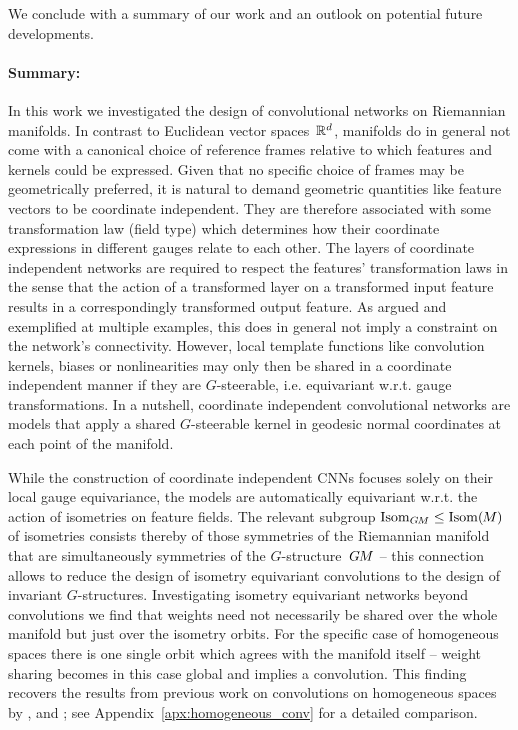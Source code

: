 


We conclude with a summary of our work and an outlook on potential future developments.
\vspace*{-1ex}


\paragraph{Summary:}

In this work we investigated the design of convolutional networks on Riemannian manifolds.
In contrast to Euclidean vector spaces~$\mathbb{R}^d$, manifolds do in general not come with a canonical choice of reference frames relative to which features and kernels could be expressed.
Given that no specific choice of frames may be geometrically preferred, it is natural to demand geometric quantities like feature vectors to be coordinate independent.
They are therefore associated with some transformation law (field type) which determines how their coordinate expressions in different gauges relate to each other.
The layers of coordinate independent networks are required to respect the features' transformation laws in the sense that the action of a transformed layer on a transformed input feature results in a correspondingly transformed output feature.
As argued and exemplified at multiple examples, this does in general not imply a constraint on the network's connectivity.
However, local template functions like convolution kernels, biases or nonlinearities may only then be shared in a coordinate independent manner if they are $G$-steerable, i.e. equivariant w.r.t. gauge transformations.
In a nutshell, coordinate independent convolutional networks are models that apply a shared $G$-steerable kernel in geodesic normal coordinates at each point of the manifold.


While the construction of coordinate independent CNNs focuses solely on their local gauge equivariance, the models are automatically equivariant w.r.t. the action of isometries on feature fields.
The relevant subgroup $\operatorname{Isom}_{G\mkern-1.4muM} \leq \operatorname{Isom}(\mkern-1.5mu M \mkern-.5mu)$ of isometries consists thereby of those symmetries of the Riemannian manifold that are simultaneously symmetries of the $G$-structure~$G\mkern-1.4muM$
-- this connection allows to reduce the design of isometry equivariant convolutions to the design of invariant $G$-structures.
Investigating isometry equivariant networks beyond convolutions we find that weights need not necessarily be shared over the whole manifold but just over the isometry orbits.
For the specific case of homogeneous spaces there is one single orbit which agrees with the manifold itself
-- weight sharing becomes in this case global and implies a convolution.
This finding recovers the results from previous work on convolutions on homogeneous spaces by
\citet{Kondor2018-GENERAL}, \citet{Cohen2018-intertwiners}\cite{Cohen2019-generaltheory} and \citet{bekkers2020bspline};
see Appendix~\ref{apx:homogeneous_conv} for a detailed comparison.



